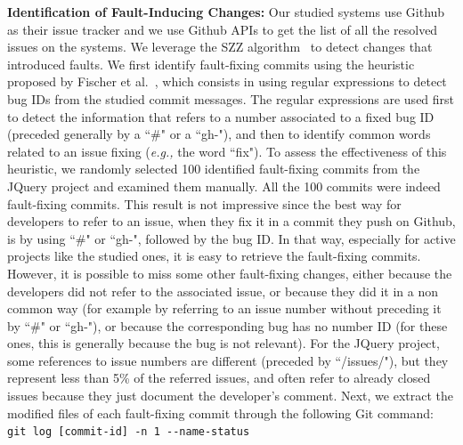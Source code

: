 \documentclass[smallcondensed]{svjour3}
\newcommand{\eg}{{\textit{e.g.,}}}
\newcommand{\mytitle}[1]{\textbf{#1:}}
\begin{document}
\mytitle{Identification of Fault-Inducing Changes} Our studied systems use Github as their issue tracker and we use Github APIs to get the list of all the resolved issues on the systems. We leverage the SZZ algorithm~\cite{sliwerski2005changes} to detect changes that introduced faults. We first identify fault-fixing commits using the heuristic proposed by Fischer et al.~\cite{fischer2003populating}, which consists in using regular expressions to detect bug IDs from the studied commit messages. {\color{blue}The regular expressions are used first to detect the information that refers to a number associated to a fixed bug ID (preceded generally by a ``\#" or a ``gh-"), and then to identify common words related to an issue fixing (\eg{} the word ``fix"). To assess the effectiveness of this heuristic, we randomly selected 100 identified fault-fixing commits from the JQuery project and examined them manually. All the 100 commits were indeed fault-fixing commits. %
This result is not impressive since the best way for developers to refer to an issue, when they fix it in a commit they push on Github, is by using ``\#" or ``gh-", followed by the bug ID. In that way, especially for active projects like the studied ones, it is easy to retrieve the fault-fixing commits. However, it is possible to miss some other fault-fixing changes, either because the developers did not refer to the associated issue, or because they did it in a non common way (for example by referring to an issue number without preceding it by ``\#" or ``gh-"), or because the corresponding bug has no number ID (for these ones, this is generally because the bug is not relevant). For the JQuery project, some references to issue numbers are different (preceded by ``/issues/"), but they represent less than 5\% of the referred issues, and often refer to already closed issues because they just document the developer's comment.} Next, we extract the modified files of each fault-fixing commit through the following Git command:\\

\texttt{git log [commit-id] -n 1 {-{}-}name-status}\\
\end{document}
